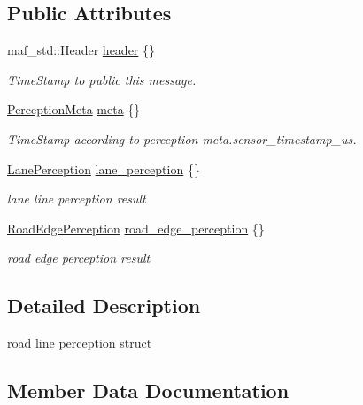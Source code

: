 \subsection*{Public Attributes}
\begin{DoxyCompactItemize}
\item 
maf\+\_\+std\+::\+Header \hyperlink{structmaf__perception__interface_1_1RoadLinePerception_aaba1cc5f5842e41063aba9a43cba571f}{header} \{\}
\begin{DoxyCompactList}\small\item\em Time\+Stamp to public this message. \end{DoxyCompactList}\item 
\hyperlink{structmaf__perception__interface_1_1PerceptionMeta}{Perception\+Meta} \hyperlink{structmaf__perception__interface_1_1RoadLinePerception_a7d059b3d8daae1c1f637c5df7c2e6119}{meta} \{\}
\begin{DoxyCompactList}\small\item\em Time\+Stamp according to perception meta.\+sensor\+\_\+timestamp\+\_\+us. \end{DoxyCompactList}\item 
\hyperlink{structmaf__perception__interface_1_1LanePerception}{Lane\+Perception} \hyperlink{structmaf__perception__interface_1_1RoadLinePerception_a7dc4c3e8e67e4205c24a8fc4b9473dca}{lane\+\_\+perception} \{\}
\begin{DoxyCompactList}\small\item\em lane line perception result \end{DoxyCompactList}\item 
\hyperlink{structmaf__perception__interface_1_1RoadEdgePerception}{Road\+Edge\+Perception} \hyperlink{structmaf__perception__interface_1_1RoadLinePerception_a06514760cd4894868db2f3cf552ec7ac}{road\+\_\+edge\+\_\+perception} \{\}
\begin{DoxyCompactList}\small\item\em road edge perception result \end{DoxyCompactList}\end{DoxyCompactItemize}


\subsection{Detailed Description}
road line perception struct 

\subsection{Member Data Documentation}
\mbox{\label{structmaf__perception__interface_1_1RoadLinePerception_aaba1cc5f5842e41063aba9a43cba571f}} 
